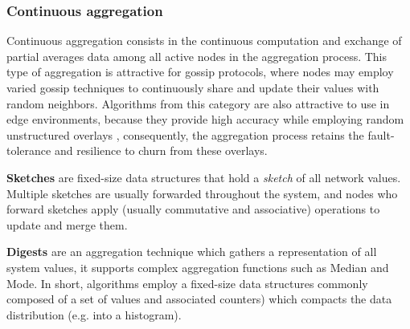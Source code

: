 \subsubsection*{Continuous aggregation}

Continuous aggregation consists in the continuous computation and exchange of partial averages data among all active nodes in the aggregation process. This type of aggregation is attractive for gossip protocols, where nodes may employ varied gossip techniques to continuously share and update their values with random neighbors. Algorithms from this category are also attractive to use in edge environments, because they provide high accuracy while employing random unstructured overlays \cite{gossip_aggregation}, consequently, the aggregation process retains the fault-tolerance and resilience to churn from these overlays.

\textbf{Sketches} are fixed-size data structures that hold a \textit{sketch} of all network values. Multiple sketches are usually forwarded throughout the system, and nodes who forward sketches apply (usually commutative and associative) operations to update and merge them.

\textbf{Digests} are an aggregation technique which gathers a representation of all system values, it supports complex aggregation functions such as Median and Mode. In short, algorithms employ a fixed-size data structures commonly composed of a set of values and associated counters) which compacts the data distribution (e.g. into a histogram).





